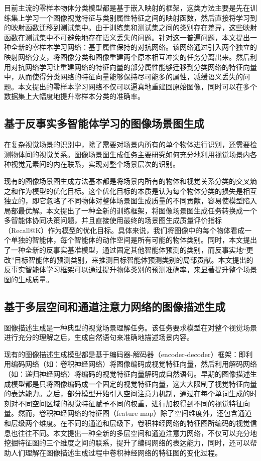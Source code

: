 目前主流的零样本物体分类模型都是基于嵌入映射的框架，这类方法主要是先在训练集上学习一个图像视觉特征与类别属性特征之间的映射函数，然后直接将学习到的映射函数迁移到测试集中。由于训练集和测试集之间的类别存在差异，这些映射函数在测试集中不可避免地存在语义丢失的问题。针对这一普遍问题，本文提出一种全新的零样本学习网络：基于属性保持的对抗网络。该网络通过引入两个独立的映射网络分支，将图像分类和图像重建两个原本相互冲突的任务分离出来。然后利用对抗网络学习让重建网络的特征向量的部分属性能够迁移到分类网络的特征向量中，从而使得分类网络的特征向量能够保持尽可能多的属性，减缓语义丢失的问题。本文提出的零样本学习网络不仅可以逼真地重建回原始图像，同时可以在多个数据集上大幅度地提升零样本分类的准确率。

\subsection{基于反事实多智能体学习的图像场景图生成}
在复杂视觉场景的识别中，除了需要对场景内所有的单个物体进行识别，还需要检测物体间的视觉关系。图像场景图生成任务主要研究如何充分地利用视觉场景内各种视觉元素间的内在联系，实现对整个场景层次的识别。

现有的图像场景图生成方法基本都是将场景内所有的物体和视觉关系分类的交叉熵之和作为模型的优化目标。这个优化目标的本质是认为每个物体分类的损失是相互独立的，即它忽略了不同物体对整体场景图生成质量的不同贡献，容易使模型陷入局部最优解。本文提出了一种全新的训练框架，将图像场景图生成任务转换成一个多智能体协同决策问题，并且直接使用最终的场景图生成质量评价指标（Recall@K）作为模型的优化目标。具体来说，我们将图像中的每个物体看成一个单独的智能体，每个智能体的动作空间是所有可能的物体类别。同时，本文提出了一种全新的反事实基准模型，通过固定其他智能体预测的类别，而反事实地“更改”目标智能体的预测类别，来推测目标智能体预测类别的局部贡献。本文提出的反事实智能体学习框架可以通过提升物体类别的预测准确率，来显著提升整个场景图的生成质量。


\subsection{基于多层空间和通道注意力网络的图像描述生成}

图像描述生成是一种典型的视觉场景理解任务。该任务要求模型在对整个视觉场景进行充分的理解之后，生成自然语句来准确地描述场景内容。

现有的图像描述生成模型都是基于编码器-解码器（encoder-decoder）框架：即利用编码网络（如：卷积神经网络）将图像编码成视觉特征向量，然后利用解码网络（如：递归神经网络）将编码的视觉特征向量解码成自然语句。早期的图像描述生成模型都是只将图像编码成一个固定的视觉特征向量，这大大限制了视觉特征向量的表达能力。之后，部分模型开始引入空间注意力机制，通过在每个单词生成的时刻对不同空间区域的视觉特征赋予不同的权重，进行加权得到不同的视觉特征向量。然而，卷积神经网络的特征图（feature map）除了空间维度外，还包含通道和层级两个维度。在不同的通道和层级下，卷积神经网络的特征图所编码的视觉信息也往往不同。本文提出一种全新的多层空间和通道注意力网络，不仅可以充分地挖掘特征图的三个维度之间的联系，提升了编码网络的表达能力，同时，还可以帮助人们理解在图像描述生成过程中卷积神经网络的特征图的变化过程。


